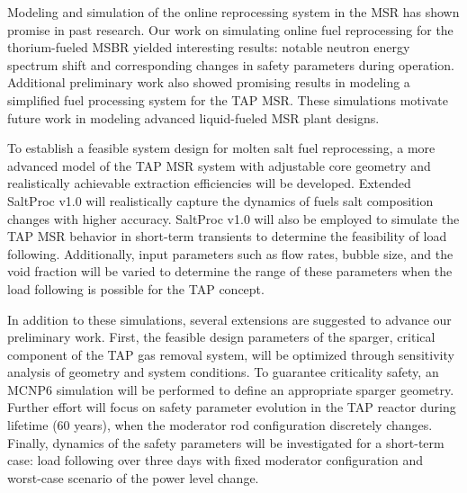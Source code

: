 Modeling and simulation of the online reprocessing system in the \gls{MSR} 
has shown promise in past research. Our work on simulating online fuel  
reprocessing for the thorium-fueled \gls{MSBR} yielded interesting results: 
notable neutron energy spectrum shift and corresponding changes in safety 
parameters during operation. Additional preliminary work also showed promising
results in modeling a simplified fuel processing system for the \gls{TAP} 
\gls{MSR}. These simulations motivate future work in modeling advanced 
liquid-fueled \gls{MSR} plant designs.

To establish a feasible system design for molten salt fuel reprocessing, a 
more advanced model of the \gls{TAP} \gls{MSR} system with adjustable core 
geometry and realistically achievable extraction efficiencies will be 
developed. Extended SaltProc v1.0 will realistically capture the dynamics of 
fuels salt composition changes with higher accuracy. SaltProc v1.0 will also 
be employed to simulate the \gls{TAP} \gls{MSR} behavior in short-term 
transients to determine the feasibility of load following. Additionally, input 
parameters such as flow rates, bubble size, and the void fraction will be 
varied to determine the range of these parameters when the load following is 
possible for the \gls{TAP} concept.

In addition to these simulations, several extensions are suggested to 
advance our preliminary work. First, the feasible design parameters of the 
sparger, critical component of the \gls{TAP} gas removal system, will be 
optimized through sensitivity analysis of geometry and system conditions. To 
guarantee criticality safety, an MCNP6 simulation will be performed to define 
an appropriate sparger geometry. Further effort will focus on safety  
parameter evolution in the \gls{TAP} reactor during lifetime (60 years),  
when the moderator rod configuration discretely changes. Finally, dynamics of 
the safety parameters will be investigated for a short-term case: load 
following over three days with fixed moderator configuration and worst-case 
scenario of the power level change. 


